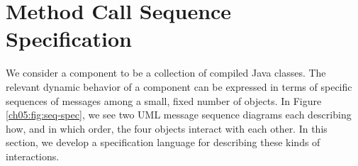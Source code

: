 \section{Method Call Sequence Specification} \label{ch05:sec:spec}

We consider a component to be a collection of compiled Java classes. The
relevant dynamic behavior of a component can be expressed in terms of specific
sequences of messages among a small, fixed number of objects. In
Figure \ref{ch05:fig:seq-spec}, we see two UML message sequence diagrams each
describing how, and in which order, the four objects interact with each other. In this
section, we develop a specification language for describing these kinds of
interactions.
 


